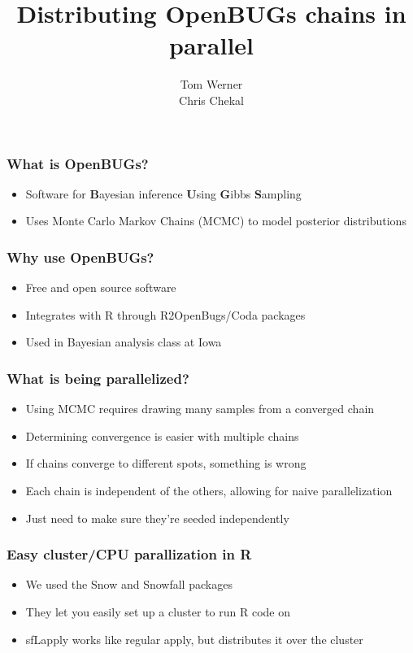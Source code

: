 \documentclass{beamer}
\title{Distributing OpenBUGs chains in parallel}
\author{Tom Werner \\ Chris Chekal}
\institute{Department of Computer Science\\The University of Iowa\\Iowa City, IA}
\begin{document}


\begin{frame}
 \titlepage
\end{frame}

\begin{frame}
  \frametitle{What is OpenBUGs?}

  \begin{itemize}
   \item Software for \textbf{B}ayesian inference \textbf{U}sing  \textbf{G}ibbs \textbf{S}ampling
   \item Uses Monte Carlo Markov Chains (MCMC) to model posterior distributions
  \end{itemize}
\end{frame}

\begin{frame}
  \frametitle{Why use OpenBUGs?}
  
  \begin{itemize}
    \item Free and open source software
    \item Integrates with R through R2OpenBugs/Coda packages
    \item Used in Bayesian analysis class at Iowa
  \end{itemize}
\end{frame}

\begin{frame}
  \frametitle{What is being parallelized?}
  
  \begin{itemize}
    \item Using MCMC requires drawing many samples from a converged chain
    \item Determining convergence is easier with multiple chains
    \item If chains converge to different spots, something is wrong
    \item Each chain is independent of the others, allowing for naive parallelization
    \item Just need to make sure they're seeded independently
  \end{itemize}
\end{frame}

\begin{frame}
  \frametitle{Easy cluster/CPU parallization in R}
  
  \begin{itemize}
    \item We used the Snow and Snowfall packages
    \item They let you easily set up a cluster to run R code on
    \item sfLapply works like regular apply, but distributes it over the cluster
  \end{itemize}
\end{frame}
\end{document}
